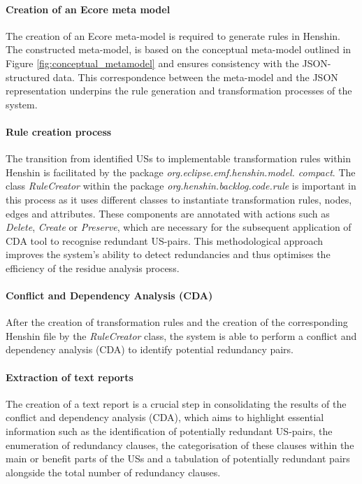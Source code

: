 \paragraph{Creation of an Ecore meta model}\label{workflow_ecore}
The creation of an Ecore meta-model is required to generate rules in Henshin. The constructed meta-model, is based on the conceptual meta-model outlined in Figure \ref{fig:conceptual_metamodel} and ensures consistency with the JSON-structured data. This correspondence between the meta-model and the JSON representation underpins the rule generation and transformation processes of the system.

\paragraph{Rule creation process}\label{workflow_rule_creator}
The transition from identified USs to implementable transformation rules within Henshin is facilitated by the package \textit{org.eclipse.emf.henshin.model. compact}. The class \textit{RuleCreator} within the package \textit{org.henshin.backlog.code.rule} is important in this process as it uses different classes to instantiate transformation rules, nodes, edges and attributes. These components are annotated with actions such as \textit{Delete}, \textit{Create} or \textit{Preserve}, which are necessary  for the subsequent application of CDA tool to recognise redundant US-pairs. This methodological approach improves the system's ability to detect redundancies and thus optimises the efficiency of the residue analysis process.

\paragraph{Conflict and Dependency Analysis (CDA)} After the creation of transformation rules and the creation of the corresponding Henshin file by the \textit{RuleCreator} class, the system is able to perform a conflict and dependency analysis (CDA) to identify potential redundancy pairs.

\paragraph{Extraction of text reports} The creation of a text report is a crucial step in consolidating the results of the conflict and dependency analysis (CDA), which aims to highlight essential information such as the identification of potentially redundant US-pairs, the enumeration of redundancy clauses, the categorisation of these clauses within the main or benefit parts of the USs and a tabulation of potentially redundant pairs alongside the total number of redundancy clauses.


